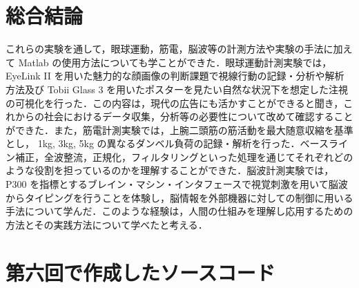 \documentclass[dvipdfmx, titlepage, t]{jsarticle}
\begin{document}
    \section{総合結論}
        これらの実験を通して，眼球運動，筋電，脳波等の計測方法や実験の手法に加えて Matlab の使用方法についても学ことができた．眼球運動計測実験では， EyeLink II を用いた魅力的な顔画像の判断課題で視線行動の記録・分析や解析方法及び Tobii Glass 3 を用いたポスターを見たい自然な状況下を想定した注視の可視化を行った．この内容は，現代の広告にも活かすことができると聞き，これからの社会におけるデータ収集，分析等の必要性について改めて確認することができた．また，筋電計測実験では，上腕二頭筋の筋活動を最大随意収縮を基準とし， 1kg, 3kg, 5kg の異なるダンベル負荷の記録・解析を行った．ベースライン補正，全波整流，正規化，フィルタリングといった処理を通じてそれぞれどのような役割を担っているのかを理解することができた．脳波計測実験では， P300 を指標とするブレイン・マシン・インタフェースで視覚刺激を用いて脳波からタイピングを行うことを体験し，脳情報を外部機器に対しての制御に用いる手法について学んだ．このような経験は，人間の仕組みを理解し応用するための方法とその実践方法について学べたと考える．
    \appendix
    
    \section{第六回で作成したソースコード}  
    \begin{mdframed}[
        splitbottomskip=10pt, splittopskip=10pt,         
        backgroundcolor=bg,
        topline=false,
        bottomline=false,
        leftline=false,
        rightline=false]
        \inputminted[linenos, 
        frame=lines, 
        breakanywhere=true,
        breaklines,
        fontsize=\small]{matlab}{code/Exp3_6_Matlab.m}    
    \end{mdframed}

    \begin{mdframed}[
        splitbottomskip=10pt, splittopskip=10pt,         
        backgroundcolor=bg,
        topline=false,
        bottomline=false,
        leftline=false,
        rightline=false]
        \inputminted[linenos, 
        frame=lines, 
        breaklines,
        breakanywhere=true,
        fontsize=\small]{matlab}{code/Exp3_6_2_Matlab.m}    
    \end{mdframed}
\end{document}
